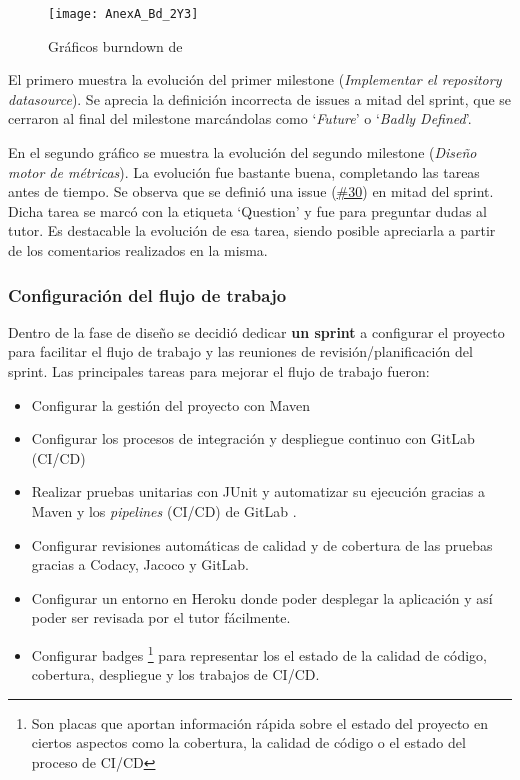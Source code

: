 \begin{figure}[!h]
	\centering
	\texttt{[image: AnexA\_Bd\_2Y3]}
	\caption{Gráficos burndown de }
	\label{fig:AnexA_Bd_2Y3}
\end{figure}
\FloatBarrier

El primero muestra la evolución del primer milestone (\textit{Implementar el repository datasource}). Se aprecia la definición incorrecta de issues a mitad del sprint, que se cerraron al final del milestone marcándolas como `\textit{Future}' o `\textit{Badly Defined}'.

En el segundo gráfico se muestra la evolución del segundo milestone (\textit{Diseño motor de métricas}). La evolución fue bastante buena, completando las tareas antes de tiempo. Se observa que se definió una issue (\href{https://gitlab.com/mlb0029/comparador-de-metricas-de-evolucion-en-repositorios-software/issues/30}{\#30}) en mitad del sprint. Dicha tarea se marcó con la etiqueta `Question' y fue para preguntar dudas al tutor. Es destacable la evolución de esa tarea, siendo posible apreciarla a partir de los comentarios realizados en la misma.

\subsubsection{Configuración del flujo de trabajo}

Dentro de la fase de diseño se decidió dedicar \textbf{un sprint} a configurar el proyecto para facilitar el flujo de trabajo y las reuniones de revisión/planificación del sprint. Las principales tareas para mejorar el flujo de trabajo fueron:
\begin{itemize}
	\item Configurar la gestión del proyecto con Maven
	\item Configurar los procesos de integración y despliegue continuo con GitLab (CI/CD)
	\item Realizar pruebas unitarias con JUnit y automatizar su ejecución gracias a Maven y los \textit{pipelines} (CI/CD) de GitLab .
	\item Configurar revisiones automáticas de calidad y de cobertura de las pruebas gracias a Codacy, Jacoco y GitLab.
	\item Configurar un entorno en Heroku donde poder desplegar la aplicación y así poder ser revisada por el tutor fácilmente.
	\item Configurar badges \footnote{Son placas que aportan información rápida sobre el estado del proyecto en ciertos aspectos como la cobertura, la calidad de código o el estado del proceso de CI/CD} para representar los el estado de la calidad de código, cobertura, despliegue y los trabajos de CI/CD.
\end{itemize}

